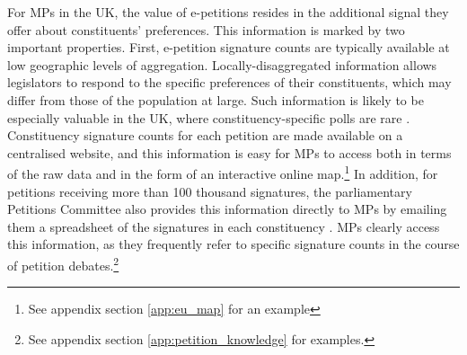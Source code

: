 \documentclass[12pt]{article}
\begin{document}
For MPs in the UK, the value of e-petitions resides in the additional signal they offer about constituents' preferences. This information is marked by two important properties. First, e-petition signature counts are typically available at low geographic levels of aggregation. Locally-disaggregated information allows legislators to respond to the specific preferences of their constituents, which may differ from those of the population at large.  Such information is likely to be especially valuable in the UK, where constituency-specific polls are rare \citep{wring2016political, johnston2018exploring}. Constituency signature counts for each petition are made available on a centralised website, and this information is easy for MPs to access both in terms of the raw data and in the form of an interactive online map.\footnote{See appendix section \ref{app:eu_map} for an example} In addition, for petitions receiving more than 100 thousand signatures, the parliamentary Petitions Committee also provides this information directly to MPs by emailing them a spreadsheet of the signatures in each constituency \citep[48]{committee2014epetitions}. MPs clearly access this information, as they frequently refer to specific signature counts in the course of petition debates.\footnote{See appendix section \ref{app:petition_knowledge} for examples.}
\end{document}
